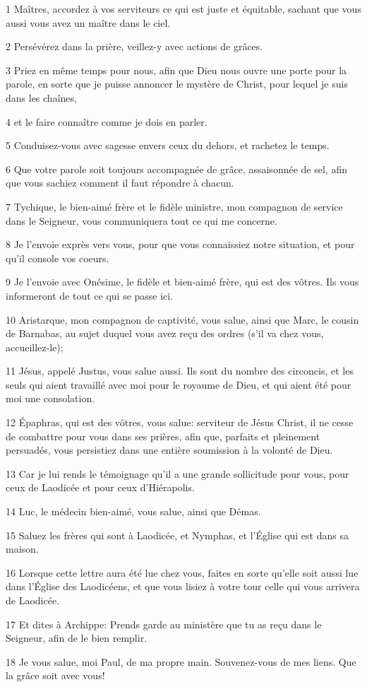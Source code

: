 \par 1 Maîtres, accordez à vos serviteurs ce qui est juste et équitable, sachant que vous aussi vous avez un maître dans le ciel.
\par 2 Persévérez dans la prière, veillez-y avec actions de grâces.
\par 3 Priez en même temps pour nous, afin que Dieu nous ouvre une porte pour la parole, en sorte que je puisse annoncer le mystère de Christ, pour lequel je suis dans les chaînes,
\par 4 et le faire connaître comme je dois en parler.
\par 5 Conduisez-vous avec sagesse envers ceux du dehors, et rachetez le temps.
\par 6 Que votre parole soit toujours accompagnée de grâce, assaisonnée de sel, afin que vous sachiez comment il faut répondre à chacun.
\par 7 Tychique, le bien-aimé frère et le fidèle ministre, mon compagnon de service dans le Seigneur, vous communiquera tout ce qui me concerne.
\par 8 Je l'envoie exprès vers vous, pour que vous connaissiez notre situation, et pour qu'il console vos coeurs.
\par 9 Je l'envoie avec Onésime, le fidèle et bien-aimé frère, qui est des vôtres. Ils vous informeront de tout ce qui se passe ici.
\par 10 Aristarque, mon compagnon de captivité, vous salue, ainsi que Marc, le cousin de Barnabas, au sujet duquel vous avez reçu des ordres (s'il va chez vous, accueillez-le);
\par 11 Jésus, appelé Justus, vous salue aussi. Ils sont du nombre des circoncis, et les seuls qui aient travaillé avec moi pour le royaume de Dieu, et qui aient été pour moi une consolation.
\par 12 Épaphras, qui est des vôtres, vous salue: serviteur de Jésus Christ, il ne cesse de combattre pour vous dans ses prières, afin que, parfaits et pleinement persuadés, vous persistiez dans une entière soumission à la volonté de Dieu.
\par 13 Car je lui rends le témoignage qu'il a une grande sollicitude pour vous, pour ceux de Laodicée et pour ceux d'Hiérapolis.
\par 14 Luc, le médecin bien-aimé, vous salue, ainsi que Démas.
\par 15 Saluez les frères qui sont à Laodicée, et Nymphas, et l'Église qui est dans sa maison.
\par 16 Lorsque cette lettre aura été lue chez vous, faites en sorte qu'elle soit aussi lue dans l'Église des Laodicéens, et que vous lisiez à votre tour celle qui vous arrivera de Laodicée.
\par 17 Et dites à Archippe: Prends garde au ministère que tu as reçu dans le Seigneur, afin de le bien remplir.
\par 18 Je vous salue, moi Paul, de ma propre main. Souvenez-vous de mes liens. Que la grâce soit avec vous!


